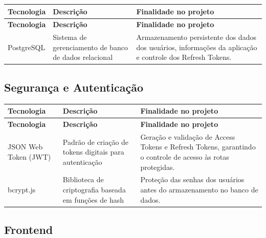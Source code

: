 \documentclass[12pt]{article}
\begin{document}
\begin{longtable}{|p{3cm}|p{4.2cm}|p{7cm}|}
  \hline
  \textbf{Tecnologia}                                   & \textbf{Descrição} & \textbf{Finalidade no projeto} \\
  \hline
  \endfirsthead

  \hline
  \textbf{Tecnologia}                                   & \textbf{Descrição} & \textbf{Finalidade no projeto} \\
  \hline
  \endhead

  PostgreSQL                                            &
  Sistema de gerenciamento de banco de dados relacional &
  Armazenamento persistente dos dados dos usuários, informações da aplicação e controle dos Refresh Tokens.   \\
  \hline
\end{longtable}

\subsection{Segurança e Autenticação}

\begin{longtable}{|p{3cm}|p{4.2cm}|p{7cm}|}
  \hline
  \textbf{Tecnologia}                                    & \textbf{Descrição} & \textbf{Finalidade no projeto} \\
  \hline
  \endfirsthead

  \hline
  \textbf{Tecnologia}                                    & \textbf{Descrição} & \textbf{Finalidade no projeto} \\
  \hline
  \endhead

  JSON Web Token (JWT)                                   &
  Padrão de criação de tokens digitais para autenticação &
  Geração e validação de Access Tokens e Refresh Tokens, garantindo o controle de acesso às rotas protegidas.  \\
  \hline

  bcrypt.js                                              &
  Biblioteca de criptografia baseada em funções de hash  &
  Proteção das senhas dos usuários antes do armazenamento no banco de dados.                                   \\
  \hline
\end{longtable}

\subsection{Frontend}
\end{document}
